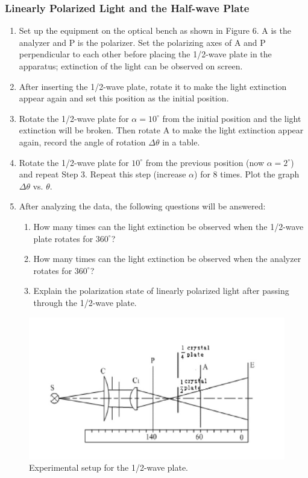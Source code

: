 \documentclass{article}
\begin{document}
\subsubsection{Linearly Polarized Light and the Half-wave Plate}
\begin{enumerate}
	\item Set up the equipment on the optical bench as shown in Figure 6. A is the analyzer and P is the polarizer. Set the polarizing axes of A and P perpendicular to each other before placing the 1/2-wave plate in the apparatus; extinction of the light can be observed on screen.
	\item After inserting the 1/2-wave plate, rotate it to make the light extinction appear again and set this position as the initial position.
	\item Rotate the 1/2-wave plate for $ \alpha= 10^\circ $ from the initial position and the light extinction will be broken. Then rotate A to make the light extinction appear again, record the angle of rotation $ \Delta \theta  $ in a table.
	\item Rotate the 1/2-wave plate for $ 10^\circ $ from the previous position (now $ \alpha=2^\circ $) and repeat Step 3. Repeat this step (increase $ \alpha $) for 8 times. Plot the graph $ \Delta\theta $ vs. $\theta. $
	\item After analyzing the data, the following questions will be answered:
	\begin{enumerate}
		\item How many times can the light extinction be observed when the 1/2-wave plate rotates for $ 360^\circ $?
		\item How many times can the light extinction be observed when the analyzer rotates for $ 360^\circ $?
		\item Explain the polarization state of linearly polarized light after passing through the 1/2-wave plate.
	\end{enumerate}
\end{enumerate}
\begin{figure}[H]
	\centering
	\includegraphics[scale=0.5]{6.png}
	\caption{Experimental setup for the 1/2-wave plate.}
\end{figure}
\end{document}

